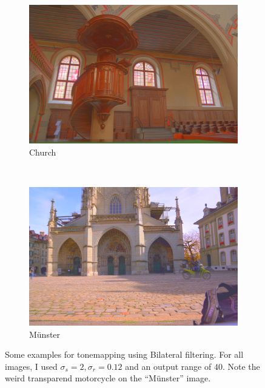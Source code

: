 \documentclass[a4spaper]{article}
\begin{document}
\begin{figure}[ht]
	\vspace{2mm}
	\begin{subfigure}[h]{0.48\textwidth}
		\centering
		\includegraphics[width=\textwidth]{tonemap/church_tonemapped_2_0-12_40}
		\caption*{Church}
	\end{subfigure}
	~ 
	\begin{subfigure}[h]{0.48\textwidth}
		\centering
		\includegraphics[width=\textwidth]{tonemap/muenster_tonemapped_2_0-12_40}
		\caption*{M\"unster}
	\end{subfigure}
\caption{Some examples for tonemapping using Bilateral filtering. For all images, I used $\sigma_s = 2, \sigma_r = 0.12$ and an output range of $40$. Note the weird transparend motorcycle on the ``M\"unster'' image.}
\label{fig:tonemap-example}
\end{figure}
\end{document}
